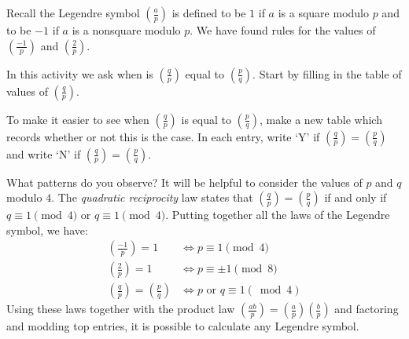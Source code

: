 \documentclass[12pt]{exam}
\begin{document}
\begin{questions}
  \question Recall the Legendre symbol $(\frac ap)$ is defined to be $1$ if $a$ is a square modulo $p$ and to be $-1$ if $a$ is a nonsquare modulo $p$. We have found rules for the values of $(\frac{-1}{p})$ and $(\frac{2}{p})$.
  
  In this activity we ask when is $(\frac qp)$ equal to $(\frac pq)$. Start by filling in the table of values of $(\frac qp)$.
  \begin{center}
  \end{center}
  \newpage
  \question To make it easier to see when $(\frac qp)$ is equal to $(\frac pq)$, make a new table which records whether or not this is the case. In each entry, write `Y' if $(\frac qp)=(\frac pq)$ and write `N' if $(\frac qp)=(\frac pq)$.
  \begin{center}
  \end{center}
  What patterns do you observe? It will be helpful to consider the values of $p$ and $q$ modulo $4$.
  \newpage
  \question The \emph{quadratic reciprocity} law states that $(\frac qp)=(\frac pq)$ if and only if $q\equiv1\pmod{4}$ or $q\equiv1\pmod{4}$. Putting together all the laws of the Legendre symbol, we have:
  \begin{align*}
    \left(\frac{-1}p\right)=1\quad&\iff p\equiv1\pmod{4}\\
    \left(\frac2p\right)=1\quad&\iff p\equiv\pm1\pmod{8}\\
    \left(\frac qp\right)=\left(\frac pq\right)&\iff p\text{ or }q\equiv1(\bmod4)
  \end{align*}
  Using these laws together with the product law $(\frac{ab}{p})=(\frac ap)(\frac bp)$ and factoring and modding top entries, it is possible to calculate any Legendre symbol.
  

\end{questions}
\end{document}
